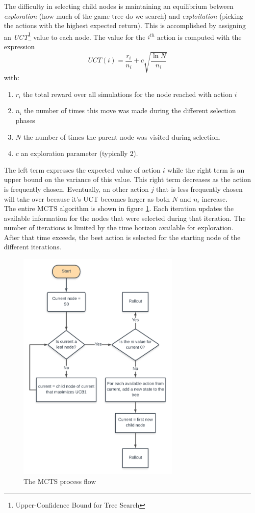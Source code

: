 The difficulty in selecting child nodes is maintaining an equilibrium between \emph{exploration} (how much of the game tree do we search) and \emph{exploitation} (picking the actions with the highest expected return). This is accomplished by assigning an \emph{UCT}\footnote{Upper-Confidence Bound for Tree Search} value to each node. The value for the $i^{th}$ action is computed with the expression
\begin{equation}
    UCT(i) = \frac{r_i}{n_i} + c \sqrt{\frac{\ln N}{n_i}}
\end{equation}
with:
\begin{enumerate}
    \item $r_i$ the total reward over all simulations for the node reached with action $i$
    \item $n_i$ the number of times this move was made during the different selection phases
    \item $N$ the number of times the parent node was visited during selection.
    \item $c$ an exploration parameter (typically $2$).
\end{enumerate}
The left term expresses the expected value of action $i$ while the right term is an upper bound on the variance of this value. This right term decreases as the action is frequently chosen. Eventually, an other action $j$ that is less frequently chosen will take over because it's UCT becomes larger as both $N$ and $n_i$ increase.\\
The entire MCTS algorithm is shown in figure \ref{fig:mcts_algo}. Each iteration updates the available information for the nodes that were selected during that iteration. The number of iterations is limited by the time horizon available for exploration. After that time exceeds, the best action is selected for the starting node of the different iterations.
\begin{figure}[htp]
    \centering
    \includegraphics[width=8cm]{images/mcts_algo.png}
    \caption{The MCTS process flow}
    \label{fig:mcts_algo}
\end{figure}
